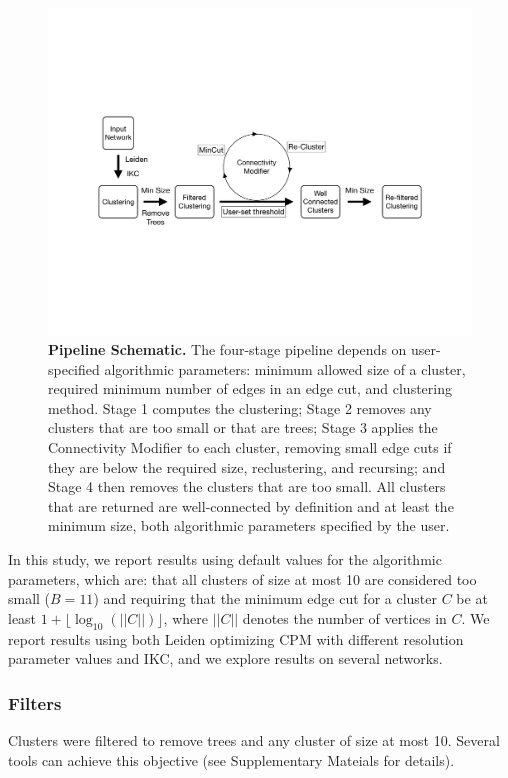 \documentclass[11pt]{article}   	%
\begin{document}
\begin{figure}[H]
\centering
\includegraphics[width=0.8\linewidth]{figs/workflow.pdf}
\caption{\textbf{Pipeline Schematic.} The four-stage pipeline depends on user-specified algorithmic parameters: minimum allowed size of a cluster, required minimum number of edges in an edge cut, and clustering method.  Stage 1 computes the clustering; Stage 2 removes any clusters that are too small or that are trees;  Stage 3 applies the  Connectivity Modifier to each cluster, removing small edge cuts if they are below the required size, reclustering, and recursing;  and Stage 4 then removes the clusters that are too small. All clusters that are returned are well-connected by definition and at least the minimum size, both algorithmic parameters specified by the user.}
\end{figure}




In this study, we report results using default values for the algorithmic parameters, which are: that all clusters of size at most 10 are considered too small ($B=11$) and requiring that the minimum edge cut for a cluster $C$ be at least  $ 1+ \lfloor \log_{10}(||C||) \rfloor$,  where $||C||$ denotes the number of vertices in $C$.
We report results using both Leiden optimizing CPM with different resolution parameter values and IKC, and we explore results on several networks.


\subsubsection{Filters} Clusters were filtered to remove trees and any cluster of size at most 10. Several tools can achieve this objective (see Supplementary Mateials for details).
\end{document}
